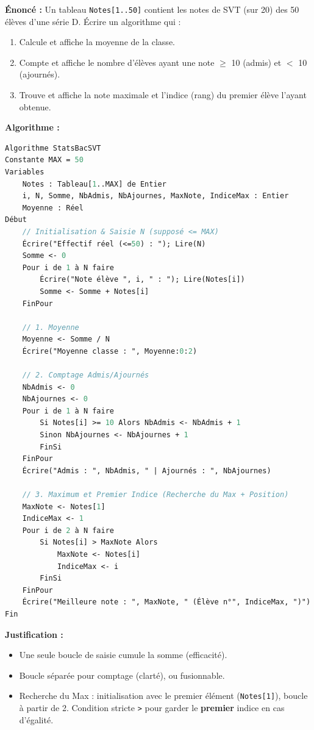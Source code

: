 \documentclass[11pt]{article}
\begin{document}
\begin{exoresolu}
\textbf{Énoncé :} Un tableau \texttt{Notes[1..50]} contient les notes de SVT (sur 20) des 50 élèves d'une série D. Écrire un algorithme qui :
\begin{enumerate}
    \item Calcule et affiche la moyenne de la classe.
    \item Compte et affiche le nombre d'élèves ayant une note $\ge$ 10 (admis) et $<$ 10 (ajournés).
    \item Trouve et affiche la note maximale et l'indice (rang) du premier élève l'ayant obtenue.
\end{enumerate}
\tcblower
\textbf{Algorithme :}
\begin{lstlisting}[language=Pascal]
Algorithme StatsBacSVT
Constante MAX = 50
Variables
    Notes : Tableau[1..MAX] de Entier
    i, N, Somme, NbAdmis, NbAjournes, MaxNote, IndiceMax : Entier
    Moyenne : Réel
Début
    // Initialisation & Saisie N (supposé <= MAX)
    Écrire("Effectif réel (<=50) : "); Lire(N)
    Somme <- 0
    Pour i de 1 à N faire
        Écrire("Note élève ", i, " : "); Lire(Notes[i])
        Somme <- Somme + Notes[i]
    FinPour

    // 1. Moyenne
    Moyenne <- Somme / N
    Écrire("Moyenne classe : ", Moyenne:0:2)

    // 2. Comptage Admis/Ajournés
    NbAdmis <- 0
    NbAjournes <- 0
    Pour i de 1 à N faire
        Si Notes[i] >= 10 Alors NbAdmis <- NbAdmis + 1
        Sinon NbAjournes <- NbAjournes + 1
        FinSi
    FinPour
    Écrire("Admis : ", NbAdmis, " | Ajournés : ", NbAjournes)

    // 3. Maximum et Premier Indice (Recherche du Max + Position)
    MaxNote <- Notes[1]
    IndiceMax <- 1
    Pour i de 2 à N faire
        Si Notes[i] > MaxNote Alors
            MaxNote <- Notes[i]
            IndiceMax <- i
        FinSi
    FinPour
    Écrire("Meilleure note : ", MaxNote, " (Élève n°", IndiceMax, ")")
Fin
\end{lstlisting}
\medskip
\textbf{Justification :}
\begin{itemize}
    \item Une seule boucle de saisie cumule la somme (efficacité).
    \item Boucle séparée pour comptage (clarté), ou fusionnable.
    \item Recherche du Max : initialisation avec le premier élément (\texttt{Notes[1]}), boucle à partir de 2. Condition stricte \texttt{>} pour garder le \textbf{premier} indice en cas d'égalité.
\end{itemize}
\end{exoresolu}
\end{document}
